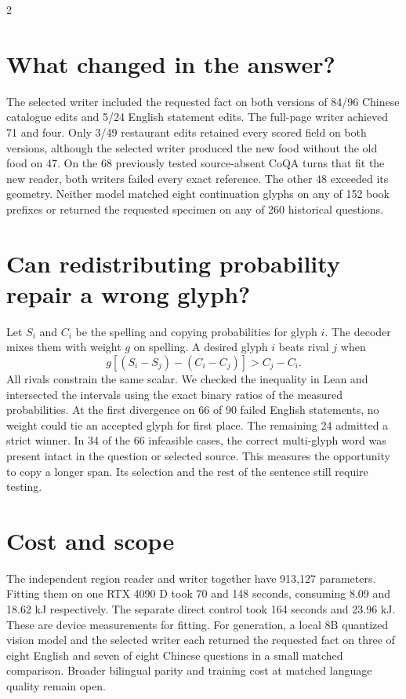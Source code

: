 \documentclass[10pt,a4paper]{article}
\begin{document}
\begin{multicols}{2}
\section*{What changed in the answer?}
The selected writer included the requested fact on both versions of 84/96 Chinese catalogue edits and 5/24 English statement edits. The full-page writer achieved 71 and four. Only 3/49 restaurant edits retained every scored field on both versions, although the selected writer produced the new food without the old food on 47. On the 68 previously tested source-absent CoQA turns that fit the new reader, both writers failed every exact reference. The other 48 exceeded its geometry. Neither model matched eight continuation glyphs on any of 152 book prefixes or returned the requested specimen on any of 260 historical questions.
\section*{Can redistributing probability repair a wrong glyph?}
Let $S_i$ and $C_i$ be the spelling and copying probabilities for glyph $i$. The decoder mixes them with weight $g$ on spelling. A desired glyph $i$ beats rival $j$ when
\[
 g[(S_i-S_j)-(C_i-C_j)]> C_j-C_i .
\]
All rivals constrain the same scalar. We checked the inequality in Lean and intersected the intervals using the exact binary ratios of the measured probabilities. At the first divergence on 66 of 90 failed English statements, no weight could tie an accepted glyph for first place. The remaining 24 admitted a strict winner. In 34 of the 66 infeasible cases, the correct multi-glyph word was present intact in the question or selected source. This measures the opportunity to copy a longer span. Its selection and the rest of the sentence still require testing.
\section*{Cost and scope}
The independent region reader and writer together have 913,127 parameters. Fitting them on one RTX 4090 D took 70 and 148 seconds, consuming 8.09 and 18.62 kJ respectively. The separate direct control took 164 seconds and 23.96 kJ. These are device measurements for fitting. For generation, a local 8B quantized vision model and the selected writer each returned the requested fact on three of eight English and seven of eight Chinese questions in a small matched comparison. Broader bilingual parity and training cost at matched language quality remain open.
\end{multicols}
\end{document}

